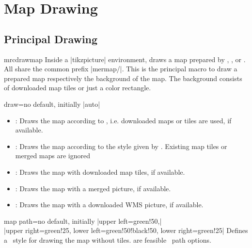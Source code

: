 \clearpage
\section{Map Drawing}

\subsection{Principal Drawing}

\begin{docCommand}{mrcdrawmap}{}
  Inside a |tikzpicture| environment,  draws a map
  prepared by , , or .
  All  share the common prefix |mermap/|.
  This is the principal macro to draw a prepared map respectively
  the background of the map. The background consists of downloaded map tiles
  or just a color rectangle.
\end{docCommand}

\begin{docMrcKey}{draw}{=}{no default, initially |auto|}
  \begin{itemize}
  \item{}: Draws the map according to ,
    i.e. downloaded maps or tiles are used, if available.
  \item{}: Draws the map according to the style given by
    . Existing map tiles or merged maps are ignored
  \item{}: Draws the map with downloaded map tiles, if
    available.
  \item{}: Draws the map with a merged picture, if
    available.
  \item{}: Draws the map with a downloaded WMS picture, if
    available.
  \end{itemize}
\end{docMrcKey}

\begin{docMrcKey}{map path}{=}{no default, initially |upper left=green!50,|\\|upper right=green!25, lower left=green!50!black!50, lower right=green!25|}
  Defines a \tikzname\ style for drawing the map without tiles.
   are feasible \tikzname\ path options.
\end{docMrcKey}


